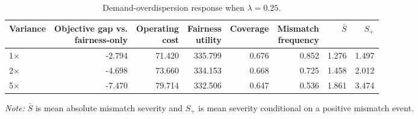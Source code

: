 \begin{table}[!ht]
    \centering
    \small
    \setlength{\tabcolsep}{4pt}
    \renewcommand{\arraystretch}{1.12}
    \caption{Demand-overdispersion response when $\lambda=0.25$.}
    \label{tab:demand_overdispersion_performance}
    \begin{tabular}{lrrrrrrr}
    \toprule
    Variance & \makecell{Objective gap vs.\\fairness-only} & \makecell{Operating\\cost} & \makecell{Fairness\\utility} & Coverage & \makecell{Mismatch\\frequency} & $\bar S$ & $S_+$ \\
    \midrule
    1$\times$ & -2.794 & 71.420 & 335.799 & 0.676 & 0.852 & 1.276 & 1.497 \\
    2$\times$ & -4.698 & 73.660 & 334.153 & 0.668 & 0.725 & 1.458 & 2.012 \\
    5$\times$ & -7.470 & 79.714 & 332.506 & 0.647 & 0.536 & 1.861 & 3.474 \\
    \bottomrule
    \end{tabular}
    \par\vspace{2pt}
    \parbox{0.98\textwidth}{\footnotesize \textit{Note:} $\bar S$ is mean absolute mismatch severity and $S_+$ is mean severity conditional on a positive mismatch event.}
\end{table}
